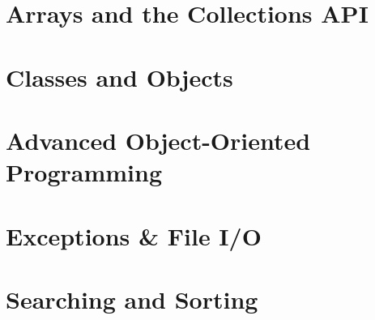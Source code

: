 \chapter{Arrays and the Collections API}
\thispagestyle{chapterstart}
\pagestyle{otherpages}
\label{chapter-arrays-collections}
\setcounter{excounter}{1}


% 

\chapter{Classes and Objects}
\thispagestyle{chapterstart}
\pagestyle{otherpages}
\label{chapter-classes}
\setcounter{excounter}{1}


\chapter{Advanced Object-Oriented Programming}
\thispagestyle{chapterstart}
\pagestyle{otherpages}
\label{chapter-advanced-oop}
\setcounter{excounter}{1}


\chapter{Exceptions \& File I/O}
\thispagestyle{chapterstart}
\pagestyle{otherpages}
\label{chapter-exceptions-io}
\setcounter{excounter}{1}


\chapter{Searching and Sorting}
\thispagestyle{chapterstart}
\pagestyle{otherpages}
\label{chapter-searching-sorting}
\setcounter{excounter}{1}


% 

